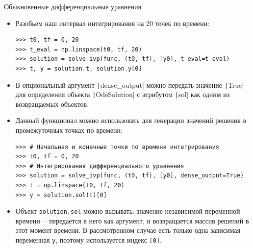 \documentclass[aspectratio=169, mathserif]{beamer}	%
\begin{document}
\begin{frame}[fragile, label=c]{Обыкновенные дифференциальные уравнения}
\scriptsize
\begin{itemize}
	\item Разобьем наш интервал интегрирования на 20 точек по времени:
\vfill
\begin{verbatim}
>>> t0, tf = 0, 20
>>> t_eval = np.linspace(t0, tf, 20)
>>> solution = solve_ivp(func, (t0, tf), [y0], t_eval=t_eval)
>>> t, y = solution.t, solution.y[0]
\end{verbatim}
\vfill
	\item В опциональный  аргумент \texttt|dense_output| можно передать значение \texttt|True| для определения объекта \texttt|OdeSolution| с атрибутом \texttt|sol| как одним из возвращаемых объектов.
	\item Данный функционал можно использовать для генерации значений решения в промежуточных точках по времени:
\vfill
\begin{verbatim}
>>> # Начальная и конечные точки по времени интегрирования
>>> t0, tf = 0, 20
>>> # Интегрирования дифференциального уравнения
>>> solution = solve_ivp(func, (t0, tf), [y0], dense_output=True)
>>> t = np.linspace(t0, tf, 20)
>>> y = solution.sol(t)[0]
\end{verbatim}
\vfill
	\item Объект \texttt{solution.sol} можно вызывать: значение независимой переменной~-- времени~-- передается в него как аргумент, и возвращается массив решений в этот момент времени. В рассмотренном случае есть только одна зависимая переменная \texttt{y}, поэтому используется индекс \texttt{[0]}.
\end{itemize}
\vfill
\end{frame}
\end{document}
